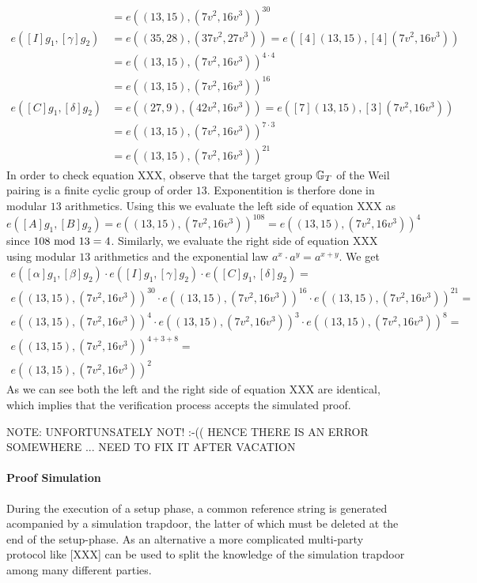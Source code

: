 \begin{example}
\begin{align*}
               & = e((13,15),(7v^2,16v^3))^{30}\\   
e([I]g_1,[\gamma]g_2) & = e((35,28),(37v^2,27v^3)) 
                            = e([4](13,15),[4](7v^2,16v^3))\\
               & = e((13,15),(7v^2,16v^3))^{4\cdot 4}\\
               & = e((13,15),(7v^2,16v^3))^{16}\\ 
e([C]g_1,[\delta]g_2) & = e((27,9),(42v^2,16v^3)) 
                            = e([7](13,15),[3](7v^2,16v^3))\\
               & = e((13,15),(7v^2,16v^3))^{7\cdot 3}\\
               & = e((13,15),(7v^2,16v^3))^{21}
\end{align*}  
In order to check equation XXX, observe that the target group $\mathbb{G}_T$ of the Weil pairing is a finite cyclic group of order $13$. Exponentition is therfore done in modular $13$ arithmetics. Using this we evaluate the left side of equation XXX as  
$$
e([A]g_1,[B]g_2) = e((13,15),(7v^2,16v^3))^{108} =e((13,15),(7v^2,16v^3))^{4}
$$
since $108 \text{ mod } 13=4$. Similarly, we evaluate the right side of equation XXX using modular $13$ arithmetics and the exponential law $a^x\cdot a^y = a^{x+y}$. We get
\begin{align*}
e([\alpha]g_1,[\beta]g_2)\cdot e([I]g_1,[\gamma]g_2)\cdot e([C]g_1,[\delta]g_2) =\\
e((13,15),(7v^2,16v^3))^{30}\cdot e((13,15),(7v^2,16v^3))^{16}\cdot e((13,15),(7v^2,16v^3))^{21} =\\
e((13,15),(7v^2,16v^3))^{4}\cdot e((13,15),(7v^2,16v^3))^{3}\cdot e((13,15),(7v^2,16v^3))^{8} =\\
e((13,15),(7v^2,16v^3))^{4+3+8} = \\
e((13,15),(7v^2,16v^3))^{2}
\end{align*}
As we can see both the left and the right side of equation XXX are identical, which implies that the verification process accepts the simulated proof.

NOTE: UNFORTUNSATELY NOT! :-(( HENCE THERE IS AN ERROR SOMEWHERE ... NEED TO FIX IT AFTER VACATION
\end{example}
\paragraph{Proof Simulation} During the execution of a setup phase, a common reference string is generated acompanied by a simulation trapdoor, the latter of which must be deleted at the end of the setup-phase. As an alternative a more complicated multi-party protocol like [XXX] can be used to split the knowledge of the simulation trapdoor among many different parties.

